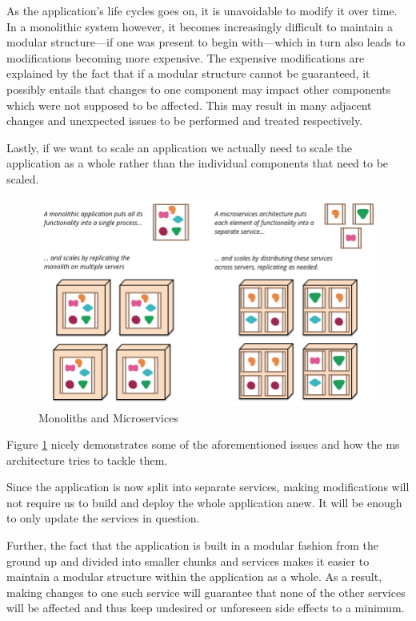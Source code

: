 As the application's life cycles goes on, it is unavoidable to modify
it over time. In a monolithic system however, it becomes increasingly
difficult to maintain a modular structure---if one was present to
begin with---which in turn also leads to modifications becoming more
expensive. \cite{ms-definition} The expensive modifications are
explained by the fact that if a modular structure cannot be
guaranteed, it possibly entails that changes to one component may
impact other components which were not supposed to be affected.
\cite{ms-definition} This may result in many adjacent changes and
unexpected issues to be performed and treated respectively.

Lastly, if we want to scale an application we actually need to scale
the application as a whole rather than the individual components that
need to be scaled.

\begin{figure}
	\centering
	\includegraphics[width=0.75\linewidth]{images/sketch.png}
	\caption{Monoliths and Microservices \cite{ms-definition}}
	\label{fig:monoliths-ms}
\end{figure}

Figure \ref{fig:monoliths-ms} nicely demonstrates some of the
aforementioned issues and how the \gls{ms} architecture tries to
tackle them.

Since the application is now split into separate services, making
modifications will not require us to build and deploy the whole
application anew. It will be enough to only update the services in
question.

Further, the fact that the application is built in a modular fashion
from the ground up and divided into smaller chunks and services makes
it easier to maintain a modular structure within the application as a
whole. As a result, making changes to one such service will guarantee
that none of the other services will be affected and thus keep
undesired or unforeseen side effects to a minimum.

